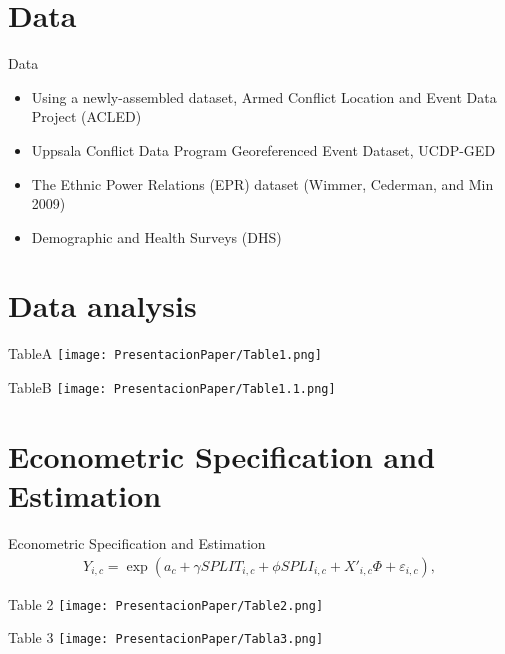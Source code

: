 \documentclass[11pt]{beamer}
\begin{document}
\section{Data}
\begin{frame}{Data}
\justifying
\begin{itemize}
\item Using a newly-assembled dataset, Armed Conflict Location and Event Data Project (ACLED)
\pause
\item Uppsala Conflict Data Program Georeferenced Event Dataset, UCDP-GED 
\pause
\item The Ethnic Power Relations (EPR) dataset (Wimmer, Cederman, and Min 2009)
\pause
\item Demographic and Health Surveys (DHS)
\end{itemize}
\end{frame}

\section{Data analysis}
\begin{frame}{TableA}
\texttt{[image: PresentacionPaper/Table1.png]} 
\centering
\end{frame}

\begin{frame}{TableB}
\texttt{[image: PresentacionPaper/Table1.1.png]} 
\centering

\end{frame}	

\section{Econometric Specification and Estimation}
\begin{frame}{ Econometric Specification and Estimation}
\begin{align}
Y_{i,c} = \exp({a}_c+{\gamma}{SPLIT_{i,c}}+{\phi}{SPLI_{i,c}}+{X'_{i,c}}{\Phi}+\varepsilon_{i,c}),
\end{align}
\centering
\end{frame}

\begin{frame}{Table 2}
\texttt{[image: PresentacionPaper/Table2.png]}
\centering
\end{frame}

\begin{frame}{Table 3}
\texttt{[image: PresentacionPaper/Tabla3.png]}   
\centering
\end{frame}
\end{document}
